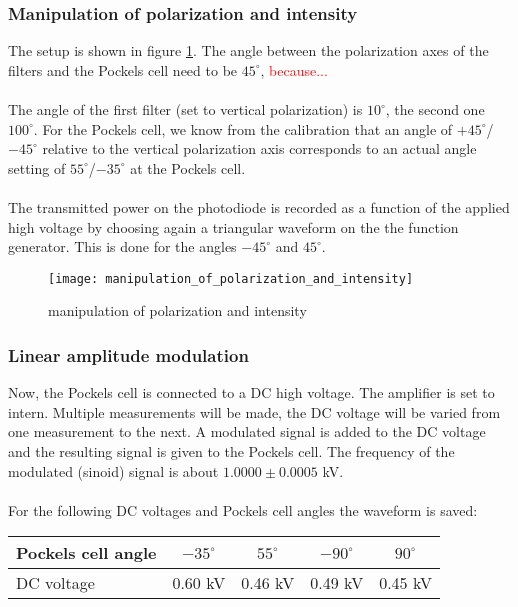 \newpage
\subsubsection{Manipulation of polarization and intensity}
The setup is shown in figure
\ref{manipulation_of_polarization_and_intensity}. The angle between
the polarization axes of the filters and the Pockels cell need to be
$45^\circ$, \textcolor{red}{because...} \\ \\
The angle of the first filter (set to vertical polarization) is
$10^\circ$, the second one $100^\circ$. For the Pockels cell, we know from
the calibration that an angle of $+45^\circ$/$-45^\circ$ relative to the 
vertical polarization axis corresponds to an actual angle setting of
$55^\circ$/$-35^\circ$ at the Pockels cell. \\ \\
The transmitted power on the photodiode is recorded as a function of
the applied high voltage by choosing again a triangular waveform on the
the function generator. This is done for the angles $-45^\circ$ and
$45^\circ$.
\begin{figure}[h!]
    \center
    \texttt{[image: manipulation\_of\_polarization\_and\_intensity]}
    \caption{manipulation of polarization and intensity}
    \label{manipulation_of_polarization_and_intensity}
\end{figure}

\subsubsection{Linear amplitude modulation}
Now, the Pockels cell is connected to a DC high voltage.
The amplifier is set to intern. Multiple
measurements will be made, the DC voltage will be varied from one
measurement to the next. A modulated signal is added to the DC voltage
and the resulting signal is given to the Pockels cell.
The frequency of the modulated (sinoid) signal is about $1.0000\pm0.0005$ kV.
\\ \\ For the following DC voltages and Pockels cell angles the waveform
is saved:
\begin{center}
    \begin{tabular}{l|cccc}
        Pockels cell angle & $-35^\circ$ & $55^\circ$
                           & $-90^\circ$ & $90^\circ$ \\
        \hline
        DC voltage & 0.60 kV & 0.46 kV & 0.49 kV & 0.45 kV
    \end{tabular}
\end{center}


